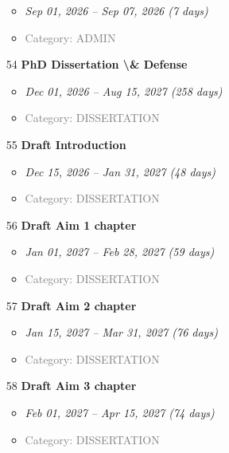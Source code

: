 \documentclass[portrait,a4paper]{article}
\begin{document}
\begin{enumerate}[leftmargin=0pt, itemindent=0pt, labelsep=0pt, labelwidth=0pt]
    \begin{itemize}
        \item \textit{Sep 01, 2026 -- Sep 07, 2026 (7 days)}
        \item \textcolor{gray}{Category: ADMIN}
    \end{itemize}
\vspace{0.3cm}
\item[54] \textbf{PhD Dissertation \textbackslash{}& Defense}
    \begin{itemize}
        \item \textit{Dec 01, 2026 -- Aug 15, 2027 (258 days)}
        \item \textcolor{gray}{Category: DISSERTATION}
    \end{itemize}
\vspace{0.3cm}
\item[55] \textbf{Draft Introduction}
    \begin{itemize}
        \item \textit{Dec 15, 2026 -- Jan 31, 2027 (48 days)}
        \item \textcolor{gray}{Category: DISSERTATION}
    \end{itemize}
\vspace{0.3cm}
\item[56] \textbf{Draft Aim 1 chapter}
    \begin{itemize}
        \item \textit{Jan 01, 2027 -- Feb 28, 2027 (59 days)}
        \item \textcolor{gray}{Category: DISSERTATION}
    \end{itemize}
\vspace{0.3cm}
\item[57] \textbf{Draft Aim 2 chapter}
    \begin{itemize}
        \item \textit{Jan 15, 2027 -- Mar 31, 2027 (76 days)}
        \item \textcolor{gray}{Category: DISSERTATION}
    \end{itemize}
\vspace{0.3cm}
\item[58] \textbf{Draft Aim 3 chapter}
    \begin{itemize}
        \item \textit{Feb 01, 2027 -- Apr 15, 2027 (74 days)}
        \item \textcolor{gray}{Category: DISSERTATION}
    \end{itemize}
\vspace{0.3cm}

\end{enumerate}
\end{document}
